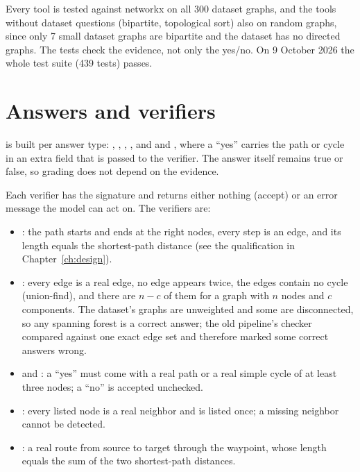 Every tool is tested against networkx on all 300 dataset graphs, and the tools without dataset questions (bipartite,
topological sort) also on random graphs, since only 7 small dataset graphs are bipartite and the dataset has no
directed graphs. The tests check the evidence, not only the yes/no. On 9 October 2026 the whole test suite (439 tests)
passes.

\section{Answers and verifiers}

 is built per answer type: , , , , and
 and , where a ``yes'' carries the path or cycle in an extra field that
is passed to the verifier. The answer itself remains true or false, so grading does not depend on the evidence.

Each verifier has the signature  and returns either nothing (accept)
or an error message the model can act on. The verifiers are:
\begin{itemize}
  \item {}: the path starts and ends at the right nodes, every step is an edge, and its
        length equals the shortest-path distance (see the qualification in Chapter~\ref{ch:design}).
  \item {}: every edge is a real edge, no edge appears twice, the edges contain no cycle (union-find),
        and there are $n-c$ of them for a graph with $n$ nodes and $c$ components. The dataset's graphs are
        unweighted and some are disconnected, so any spanning forest is a correct answer; the old pipeline's checker
        compared against one exact edge set and therefore marked some correct answers wrong.
  \item {} and : a ``yes'' must come with a real path or a real simple
        cycle of at least three nodes; a ``no'' is accepted unchecked.
  \item {}: every listed node is a real neighbor and is listed once; a missing neighbor cannot be
        detected.
  \item {}: a real route from source to target through the waypoint, whose length equals the sum
        of the two shortest-path distances.
\end{itemize}

